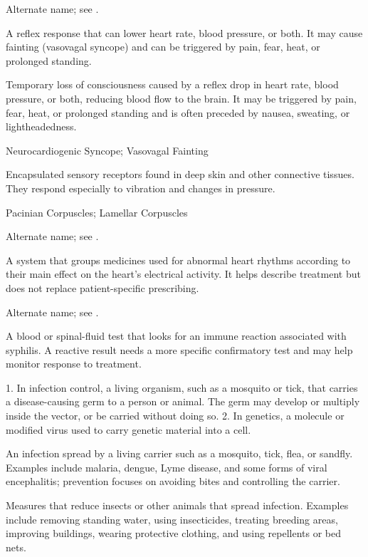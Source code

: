  Alternate name; see .

 A reflex response that can lower heart rate, blood pressure, or both. It may cause fainting (vasovagal syncope) and can be triggered by pain, fear, heat, or prolonged standing.

 Temporary loss of consciousness caused by a reflex drop in heart rate, blood pressure, or both, reducing blood flow to the brain. It may be triggered by pain, fear, heat, or prolonged standing and is often preceded by nausea, sweating, or lightheadedness.

\synonyms
Neurocardiogenic Syncope; Vasovagal Fainting

 Encapsulated sensory receptors found in deep skin and other connective tissues. They respond especially to vibration and changes in pressure.

\synonyms
Pacinian Corpuscles; Lamellar Corpuscles

 Alternate name; see .

 A system that groups medicines used for abnormal heart rhythms according to their main effect on the heart’s electrical activity. It helps describe treatment but does not replace patient-specific prescribing.

 Alternate name; see .

 A blood or spinal-fluid test that looks for an immune reaction associated with syphilis. A reactive result needs a more specific confirmatory test and may help monitor response to treatment.

 1. In infection control, a living organism, such as a mosquito or tick, that carries a disease-causing germ to a person or animal. The germ may develop or multiply inside the vector, or be carried without doing so. 2. In genetics, a molecule or modified virus used to carry genetic material into a cell.

 An infection spread by a living carrier such as a mosquito, tick, flea, or sandfly. Examples include malaria, dengue, Lyme disease, and some forms of viral encephalitis; prevention focuses on avoiding bites and controlling the carrier.

 Measures that reduce insects or other animals that spread infection. Examples include removing standing water, using insecticides, treating breeding areas, improving buildings, wearing protective clothing, and using repellents or bed nets.

